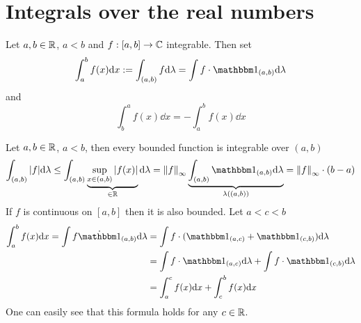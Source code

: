 \documentclass[../../script.tex]{subfiles}
\begin{document}
\section{Integrals over the real numbers}

\begin{defi}
    Let $a, b \in \mathbb{R}$, $a < b$ and $f: [a, b] \rightarrow \mathbb{C}$ integrable. Then set 
    \[
        \int_a^b f(x) \dd x := \int_{(a, b)} f \dd\lambda = \int f \cdot \charfun_{(a, b)} \dd\lambda
    \]
    and 
    \[
        \int_b^a f(x) \dd x = -\int_a^b f(x) \dd x
    \]
\end{defi}

\begin{rem}
    Let $a, b \in \mathbb{R}$, $a < b$, then every bounded function is integrable over $(a, b)$
    \[
        \int_{(a, b)} \abs{f} \dd\lambda \le \int_{(a, b)} \underbrace{\sup_{x \in (a, b)} \abs{f(x)}}_{\in \realn} \dd\lambda = \supnorm{f} \underbrace{\int_{(a, b)} \charfun_{(a, b)} \dd\lambda}_{\lambda((a, b))} = \supnorm{f} \cdot (b - a)
    \]
    If $f$ is continuous on $[a, b]$ then it is also bounded. Let $a < c < b$
    \begin{align*}
        \int_a^b f(x) \dd x = \int f \dot \charfun_{(a, b)} \dd\lambda &= \int f \cdot (\charfun_{(a, c)} + \charfun_{(c, b)}) \dd\lambda \\
        &= \int f \cdot \charfun_{(a, c)} \dd\lambda + \int f \cdot \charfun_{(c, b)} \dd\lambda \\
        &= \int_a^c f(x) \dd x + \int_c^b f(x) \dd x
    \end{align*}
    One can easily see that this formula holds for any $c \in \mathbb{R}$.
\end{rem}
\end{document}
